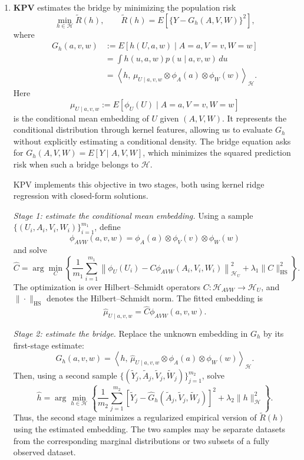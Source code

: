 \documentclass[11pt,twoside]{article}
\begin{document}
\begin{enumerate}
    \item \textbf{KPV} estimates the bridge by minimizing the population risk
\[
    \min_{h\in\mathcal H}\widetilde R(h),
    \qquad
    \widetilde R(h)
    =E\!\left[\{Y-G_h(A,V,W)\}^2\right],
\]
where
\begin{align*}
    G_h(a,v,w)
    &:=E[h(U,a,w)\mid A=a,V=v,W=w]\\
    &=\int h(u,a,w)p(u\mid a,v,w)\,du\\
    &=\left\langle
        h,\,
        \mu_{U\mid a,v,w}
        \otimes\phi_A(a)\otimes\phi_W(w)
      \right\rangle_{\mathcal H}.
\end{align*}
Here
\[
    \mu_{U\mid a,v,w}
    :=E[\phi_U(U)\mid A=a,V=v,W=w]
\]
is the conditional mean embedding of $U$ given $(A,V,W)$.
It represents the conditional distribution through kernel
features, allowing us to evaluate $G_h$ without explicitly
estimating a conditional density. The bridge equation asks
for $G_h(A,V,W)=E[Y\mid A,V,W]$, which minimizes the squared
prediction risk when such a bridge belongs to $\mathcal H$.

KPV implements this objective in two stages, both using
kernel ridge regression with closed-form solutions.

\emph{Stage 1: estimate the conditional mean embedding.}
Using a sample $\{(U_i,A_i,V_i,W_i)\}_{i=1}^{m_1}$, define
\[
    \phi_{AVW}(a,v,w)
    =\phi_A(a)\otimes\phi_V(v)\otimes\phi_W(w)
\]
and solve
\[
    \widehat C
    =\arg\min_C
    \left\{
        \frac{1}{m_1}\sum_{i=1}^{m_1}
        \left\|
            \phi_U(U_i)
            -C\phi_{AVW}(A_i,V_i,W_i)
        \right\|_{\mathcal H_U}^{2}
        +\lambda_1\|C\|_{\mathrm{HS}}^{2}
    \right\}.
\]
The optimization is over Hilbert--Schmidt operators
$C:\mathcal H_{AVW}\to\mathcal H_U$, and
$\|\cdot\|_{\mathrm{HS}}$ denotes the Hilbert--Schmidt norm.
The fitted embedding is
\[
    \widehat\mu_{U\mid a,v,w}
    =\widehat C\phi_{AVW}(a,v,w).
\]

\emph{Stage 2: estimate the bridge.}
Replace the unknown embedding in $G_h$ by its first-stage
estimate:
\[
    \widehat G_h(a,v,w)
    =
    \left\langle
        h,\,
        \widehat\mu_{U\mid a,v,w}
        \otimes\phi_A(a)\otimes\phi_W(w)
    \right\rangle_{\mathcal H}.
\]
Then, using a second sample
$\{(\widetilde Y_j,\widetilde A_j,
\widetilde V_j,\widetilde W_j)\}_{j=1}^{m_2}$, solve
\[
    \widehat h
    =\arg\min_{h\in\mathcal H}
    \left\{
        \frac{1}{m_2}\sum_{j=1}^{m_2}
        \left[
            \widetilde Y_j
            -\widehat G_h(
                \widetilde A_j,\widetilde V_j,\widetilde W_j)
        \right]^2
        +\lambda_2\|h\|_{\mathcal H}^{2}
    \right\}.
\]
Thus, the second stage minimizes a regularized empirical
version of $\widetilde R(h)$ using the estimated embedding.
The two samples may be separate datasets from the corresponding
marginal distributions or two subsets of a fully observed dataset.


\end{enumerate}
\end{document}

